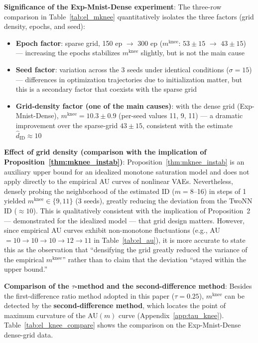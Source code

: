\documentclass[make,article,submit,pdftex,moreauthors]{Definitions/mdpi}
\newcommand{\mknee}{m^{\mathrm{knee}}}
\begin{document}
\textbf{Significance of the Exp-Mnist-Dense experiment}:
The three-row comparison in Table~\ref{tab:el_mknee} quantitatively isolates the three
factors (grid density, epochs, and seed):
\begin{itemize}
  \item \textbf{Epoch factor}: sparse grid, 150 ep $\to$ 300 ep ($\mknee$: $53\pm15$ $\to$ $43\pm15$) --- increasing the epochs stabilizes $\mknee$ slightly, but is not the main cause
  \item \textbf{Seed factor}: variation across the 3 seeds under identical conditions ($\sigma = 15$) --- differences in optimization trajectories due to initialization matter, but this is a secondary factor that coexists with the sparse grid
  \item \textbf{Grid-density factor (one of the main causes)}: with the dense grid (Exp-Mnist-Dense), $\mknee = 10.3 \pm 0.9$ (per-seed values 11, 9, 11) --- a dramatic improvement over the sparse-grid $43\pm15$, consistent with the estimate $\hat{d}_\mathrm{ID} \approx 10$
\end{itemize}

\noindent
\textbf{Effect of grid density (comparison with the implication of Proposition~\ref{thm:mknee_instab})}:
Proposition~\ref{thm:mknee_instab} is an auxiliary upper bound for an idealized monotone
saturation model and does not apply directly to the empirical AU curves of nonlinear VAEs.
Nevertheless, densely probing the neighborhood of the estimated ID ($m = 8$--16) in steps of 1
yielded $\mknee \in \{9, 11\}$ (3 seeds), greatly reducing the deviation from the TwoNN ID
($\approx 10$).
This is qualitatively consistent with the implication of Proposition~2 --- demonstrated for
the idealized model --- that grid design matters.
However, since empirical AU curves exhibit non-monotone fluctuations
(e.g., AU$=10 \to 10 \to 10 \to 12 \to 11$ in Table~\ref{tab:el_au}), it is more accurate to
state this as the observation that ``densifying the grid greatly reduced the variance of the
empirical $\mknee$'' rather than to claim that the deviation ``stayed within the upper bound.''

\noindent
\textbf{Comparison of the $\tau$-method and the second-difference method}:
Besides the first-difference ratio method adopted in this paper ($\tau = 0.25$), $\mknee$ can
be detected by the \textbf{second-difference method}, which locates the point of maximum
curvature of the AU$(m)$ curve (Appendix~\ref{app:tau_knee}).
Table~\ref{tab:el_knee_compare} shows the comparison on the Exp-Mnist-Dense dense-grid data.
\end{document}
